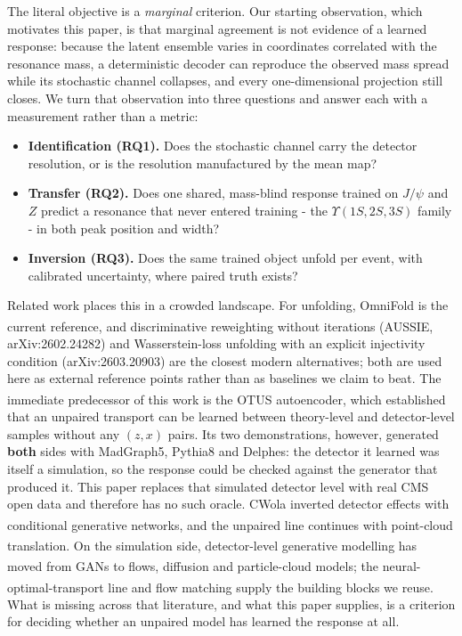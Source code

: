 \documentclass[11pt,a4paper]{article}
\begin{document}
The literal objective is a \emph{marginal} criterion. Our starting observation, which
motivates this paper, is that marginal agreement is not evidence of a learned
response: because the latent ensemble varies in coordinates correlated with the
resonance mass, a deterministic decoder can reproduce the observed mass spread while
its stochastic channel collapses, and every one-dimensional projection still closes.
We turn that observation into three questions and answer each with a measurement
rather than a metric:

\begin{itemize}
  \item \textbf{Identification (RQ1).} Does the stochastic channel carry the detector
        resolution, or is the resolution manufactured by the mean map?
  \item \textbf{Transfer (RQ2).} Does one shared, mass-blind response trained on
        $J/\psi$ and $Z$ predict a resonance that never entered training - the
        $\Upsilon(1S,2S,3S)$ family - in both peak position and width?
  \item \textbf{Inversion (RQ3).} Does the same trained object unfold per event, with
        calibrated uncertainty, where paired truth exists?
\end{itemize}

Related work places this in a crowded landscape. For unfolding, OmniFold is the
current reference\textsuperscript{\cite{omnifold}}, and discriminative reweighting
without iterations (AUSSIE, arXiv:2602.24282) and Wasserstein-loss unfolding with an
explicit injectivity condition (arXiv:2603.20903) are the closest modern
alternatives; both are used here as external reference points rather than as
baselines we claim to beat. The immediate predecessor of this work is the OTUS
autoencoder\textsuperscript{\cite{otus_paper}}, which established that an unpaired
transport can be learned between theory-level and detector-level samples without
any $(z,x)$ pairs. Its two demonstrations, however, generated \textbf{both} sides with
MadGraph5, Pythia8 and Delphes: the detector it learned was itself a simulation, so
the response could be checked against the generator that produced it. This paper
replaces that simulated detector level with real CMS open data and therefore has no
such oracle. CWola inverted detector effects with conditional generative
networks\textsuperscript{\cite{cwola}}, and the unpaired line continues with
point-cloud translation\textsuperscript{\cite{unpairedpointcloud}}.
On the simulation side, detector-level generative
modelling has moved from GANs\textsuperscript{\cite{calogan,caloflow}} to flows,
diffusion and particle-cloud models\textsuperscript{\cite{calochallenge}}; the
neural-optimal-transport line\textsuperscript{\cite{cuturi_sinkhorn,genevay_sinkhorn}}
and flow matching\textsuperscript{\cite{lipman_flow,albergo_stochastic}} supply the
building blocks we reuse. What is missing across that literature, and what this
paper supplies, is a criterion for deciding whether an unpaired model has learned
the response at all.
\end{document}
